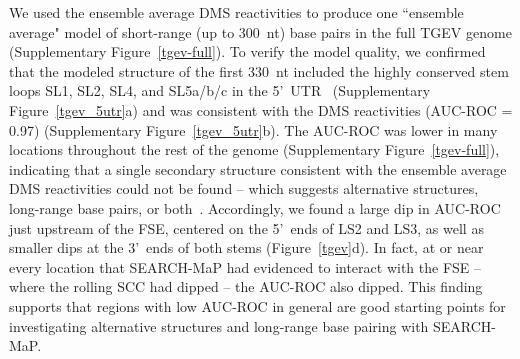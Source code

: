 \documentclass[main.tex]{subfiles}
\begin{document}
We used the ensemble average DMS reactivities to produce one ``ensemble average" model of short-range (up to 300~nt) base pairs in the full TGEV genome (Supplementary Figure~\ref{tgev-full}).
To verify the model quality, we confirmed that the modeled structure of the first 330~nt included the highly conserved stem loops SL1, SL2, SL4, and SL5a/b/c in the 5'~UTR~\cite{Yang2015a} (Supplementary Figure~\ref{tgev_5utr}a) and was consistent with the DMS reactivities (AUC-ROC = 0.97) (Supplementary Figure~\ref{tgev_5utr}b).
The AUC-ROC was lower in many locations throughout the rest of the genome (Supplementary Figure~\ref{tgev-full}), indicating that a single secondary structure consistent with the ensemble average DMS reactivities could not be found -- which suggests alternative structures, long-range base pairs, or both~\cite{Lan2022}.
Accordingly, we found a large dip in AUC-ROC just upstream of the FSE, centered on the 5'~ends of LS2 and LS3, as well as smaller dips at the 3'~ends of both stems (Figure~\ref{tgev}d).
In fact, at or near every location that SEARCH-MaP had evidenced to interact with the FSE -- where the rolling SCC had dipped -- the AUC-ROC also dipped.
This finding supports that regions with low AUC-ROC in general are good starting points for investigating alternative structures and long-range base pairing with SEARCH-MaP.
\end{document}
